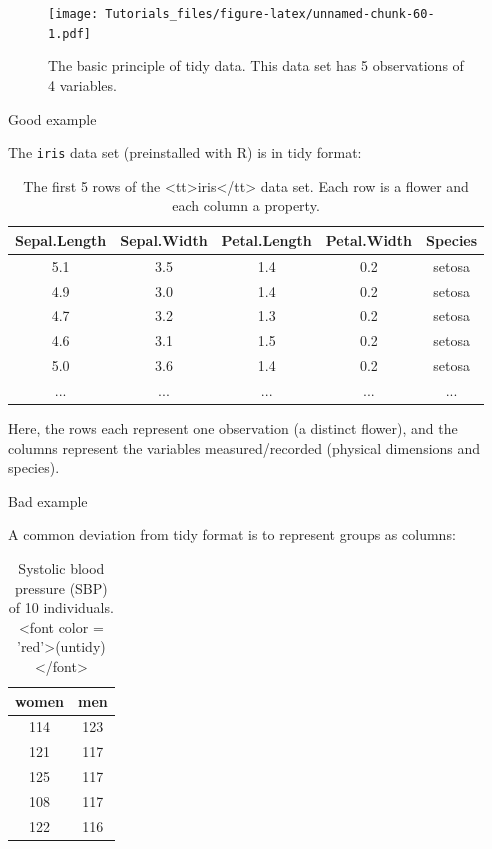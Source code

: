 \documentclass[
]{book}
\begin{document}
\begin{figure}
\centering
\texttt{[image: Tutorials\_files/figure-latex/unnamed-chunk-60-1.pdf]}
\caption{\label{fig:unnamed-chunk-60}The basic principle of tidy data. This data set has 5 observations of 4 variables.}
\end{figure}

Good example

The \texttt{iris} data set (preinstalled with R) is in tidy format:

\begin{table}

\caption{\label{tab:unnamed-chunk-61}The first 5 rows of the <tt>iris</tt> data set. Each row is a flower and each column a property.}
\centering
\fontsize{11}{13}\selectfont
\begin{tabular}[t]{c|c|c|c|c}
\hline
Sepal.Length & Sepal.Width & Petal.Length & Petal.Width & Species\\
\hline
5.1 & 3.5 & 1.4 & 0.2 & setosa\\
\hline
4.9 & 3.0 & 1.4 & 0.2 & setosa\\
\hline
4.7 & 3.2 & 1.3 & 0.2 & setosa\\
\hline
4.6 & 3.1 & 1.5 & 0.2 & setosa\\
\hline
5.0 & 3.6 & 1.4 & 0.2 & setosa\\
\hline
... & ... & ... & ... & ...\\
\hline
\end{tabular}
\end{table}

Here, the rows each represent one observation (a distinct flower), and the columns represent the variables measured/recorded (physical dimensions and species).

Bad example

A common deviation from tidy format is to represent groups as columns:

\begin{table}

\caption{\label{tab:unnamed-chunk-62}Systolic blood pressure (SBP) of 10 individuals. <font color = 'red'>(untidy)</font>}
\centering
\fontsize{11}{13}\selectfont
\begin{tabular}[t]{c|c}
\hline
women & men\\
\hline
114 & 123\\
\hline
121 & 117\\
\hline
125 & 117\\
\hline
108 & 117\\
\hline
122 & 116\\
\hline
\end{tabular}
\end{table}
\end{document}
